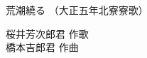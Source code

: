 \documentclass[10pt,b5j]{tarticle} %
\begin{document}
\begin{minipage}[c]{0.7\hsize} %
    \begin{center}
        {\LARGE
            荒潮繞る %
        }
        {\small 
            （大正五年北寮寮歌） %
        }
    \end{center}
\end{minipage}
\begin{minipage}[c]{0.3\hsize} %
    \begin{flushright} %
        桜井芳次郎君 作歌\\橋本吉郎君 作曲 %
    \end{flushright}
\end{minipage}
\end{document}
